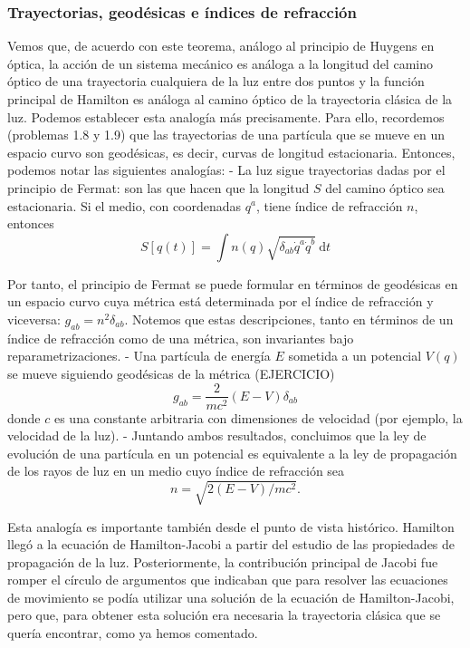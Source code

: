 \subsubsection{Trayectorias, geodésicas e índices de refracción}
Vemos que, de acuerdo con este teorema, análogo al principio de Huygens en óptica, la acción de un sistema mecánico es análoga a la longitud del camino óptico de una trayectoria cualquiera de la luz entre dos puntos y la función principal de Hamilton es análoga al camino óptico de la trayectoria clásica de la luz. Podemos establecer esta analogía más precisamente. Para ello, recordemos (problemas 1.8 y 1.9) que las trayectorias de una partícula que se mueve en un espacio curvo son geodésicas, es decir, curvas de longitud estacionaria. Entonces, podemos notar las siguientes analogías:
- La luz sigue trayectorias dadas por el principio de Fermat: son las que hacen que la longitud $S$ del camino óptico sea estacionaria. Si el medio, con coordenadas $q^{a}$, tiene índice de refracción $n$, entonces
$$
S[q(t)]=\int n(q) \sqrt{\delta_{a b} \dot{q}^{a} \dot{q}^{b}} \mathrm{~d} t
$$

Por tanto, el principio de Fermat se puede formular en términos de geodésicas en un espacio curvo cuya métrica está determinada por el índice de refracción y viceversa: $g_{a b}=n^{2} \delta_{a b}$. Notemos que estas descripciones, tanto en términos de un índice de refracción como de una métrica, son invariantes bajo reparametrizaciones.
- Una partícula de energía $E$ sometida a un potencial $V(q)$ se mueve siguiendo geodésicas de la métrica (EJERCICIO)
$$
g_{a b}=\frac{2}{m c^{2}}(E-V) \delta_{a b}
$$
donde $c$ es una constante arbitraria con dimensiones de velocidad (por ejemplo, la velocidad de la luz).
- Juntando ambos resultados, concluimos que la ley de evolución de una partícula en un potencial es equivalente a la ley de propagación de los rayos de luz en un medio cuyo índice de refracción sea
$$
n=\sqrt{2(E-V) / m c^{2}} .
$$

Esta analogía es importante también desde el punto de vista histórico. Hamilton llegó a la ecuación de Hamilton-Jacobi a partir del estudio de las propiedades de propagación de la luz. Posteriormente, la contribución principal de Jacobi fue romper el círculo de argumentos que indicaban que para resolver las ecuaciones de movimiento se podía utilizar una solución de la ecuación de Hamilton-Jacobi, pero que, para obtener esta solución era necesaria la trayectoria clásica que se quería encontrar, como ya hemos comentado.
